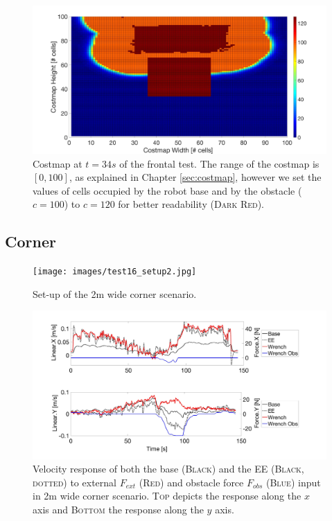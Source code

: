 \begin{figure}
   \centering
   \includegraphics[width=\textwidth]{images/test2_costmap.jpg}
   \caption{Costmap at $t=34s$ of the frontal test. The range of the costmap is $[0,100]$, as explained in Chapter \ref{sec:costmap}, however we set the values of cells occupied by the robot base and by the obstacle ($c = 100$) to $c = 120$ for better readability (\textsc{Dark Red}).}
   \label{pics:test2_costmap}
\end{figure}

\subsection{Corner}

\begin{figure}
   \centering
   \texttt{[image: images/test16\_setup2.jpg]}
   \caption{Set-up of the \unit{2}{m} wide corner scenario.}
   \label{pics:test16_setup}
\end{figure}

\begin{figure}
   \centering
   \includegraphics[width=\textwidth]{images/test16.jpg}
   \caption{Velocity response of both the base (\textsc{Black}) and the EE (\textsc{Black, dotted}) to external $F_{ext }$ (\textsc{Red}) and obstacle force $F_{obs}$ (\textsc{Blue}) input in \unit{2}{m} wide corner scenario. \textsc{Top} depicts the response along the $x$ axis and \textsc{Bottom} the response along the $y$ axis.}
   \label{pics:test16}
\end{figure}

